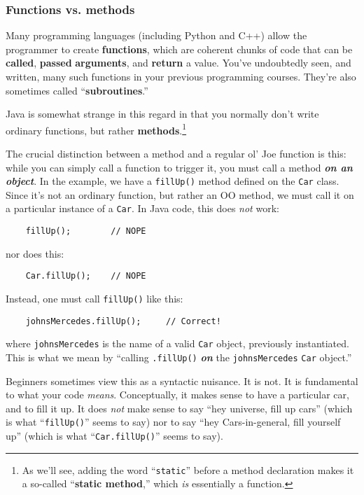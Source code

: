\subsubsection{Functions vs. methods}

Many programming languages (including Python and C++) allow the programmer to
create \textbf{functions}, which are coherent chunks of code that can be
\textbf{called}, \textbf{passed} \textbf{arguments}, and \textbf{return} a
value. You've undoubtedly seen, and written, many such functions in your
previous programming courses. They're also sometimes called
``\textbf{subroutines}.''

Java is somewhat strange in this regard in that you normally don't write
ordinary functions, but rather \textbf{methods}.\footnote{As we'll see, adding
the word ``\texttt{static}'' before a method declaration makes it a so-called
``\textbf{static method},'' which \textit{is} essentially a function.}

The crucial distinction between a method and a regular ol' Joe function is
this: while you can simply call a function to trigger it, you must call a
method \textbf{\textit{on an object}}. In the example, we have a
\texttt{fillUp()} method defined on the \texttt{Car} class. Since it's not an
ordinary function, but rather an OO method, we must call it on a particular
instance of a \texttt{Car}. In Java code, this does \textit{not} work:

\begin{verbatim}
    fillUp();        // NOPE
\end{verbatim}

nor does this:

\begin{verbatim}
    Car.fillUp();    // NOPE
\end{verbatim}

Instead, one must call \texttt{fillUp()} like this:

\begin{verbatim}
    johnsMercedes.fillUp();     // Correct!
\end{verbatim}

where \texttt{johnsMercedes} is the name of a valid \texttt{Car} object,
previously instantiated. This is what we mean by ``calling \texttt{.fillUp()}
\textit{\textbf{on}} the \texttt{johnsMercedes} \texttt{Car} object.''

Beginners sometimes view this as a syntactic nuisance. It is not. It is
fundamental to what your code \textit{means}. Conceptually, it makes sense to
have a particular car, and to fill it up. It does \textit{not} make sense to
say ``hey universe, fill up cars'' (which is what ``\texttt{fillUp()}'' seems to
say) nor to say ``hey Cars-in-general, fill yourself up'' (which is what
``\texttt{Car.fillUp()}'' seems to say).

